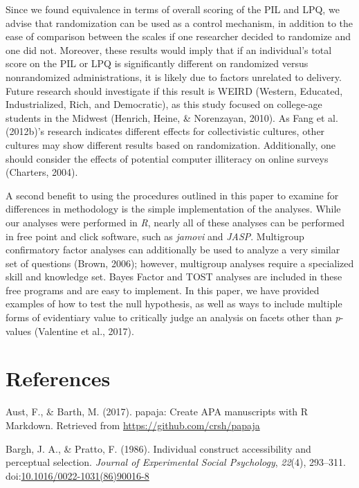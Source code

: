 \documentclass[english,man]{apa6}
\theoremstyle{definition}
\theoremstyle{definition}
\theoremstyle{definition}
\theoremstyle{remark}
\begin{document}
Since we found equivalence in terms of overall scoring of the PIL and
LPQ, we advise that randomization can be used as a control mechanism, in
addition to the ease of comparison between the scales if one researcher
decided to randomize and one did not. Moreover, these results would
imply that if an individual's total score on the PIL or LPQ is
significantly different on randomized versus nonrandomized
administrations, it is likely due to factors unrelated to delivery.
Future research should investigate if this result is WEIRD (Western,
Educated, Industrialized, Rich, and Democratic), as this study focused
on college-age students in the Midwest (Henrich, Heine, \& Norenzayan,
2010). As Fang et al. (2012b)'s research indicates different effects for
collectivistic cultures, other cultures may show different results based
on randomization. Additionally, one should consider the effects of
potential computer illiteracy on online surveys (Charters, 2004).

A second benefit to using the procedures outlined in this paper to
examine for differences in methodology is the simple implementation of
the analyses. While our analyses were performed in \emph{R}, nearly all
of these analyses can be performed in free point and click software,
such as \emph{jamovi} and \emph{JASP}. Multigroup confirmatory factor
analyses can additionally be used to analyze a very similar set of
questions (Brown, 2006); however, multigroup analyses require a
specialized skill and knowledge set. Bayes Factor and TOST analyses are
included in these free programs and are easy to implement. In this
paper, we have provided examples of how to test the null hypothesis, as
well as ways to include multiple forms of evidentiary value to
critically judge an analysis on facets other than \emph{p}-values
(Valentine et al., 2017).

\newpage

\section{References}\label{references}

\setlength{\parindent}{-0.5in} \setlength{\leftskip}{0.5in}

\hypertarget{refs}{}
\hypertarget{ref-Aust2017}{}
Aust, F., \& Barth, M. (2017). papaja: Create APA manuscripts with R
Markdown. Retrieved from \url{https://github.com/crsh/papaja}

\hypertarget{ref-Bargh1986}{}
Bargh, J. A., \& Pratto, F. (1986). Individual construct accessibility
and perceptual selection. \emph{Journal of Experimental Social
Psychology}, \emph{22}(4), 293--311.
doi:\href{https://doi.org/10.1016/0022-1031(86)90016-8}{10.1016/0022-1031(86)90016-8}
\end{document}
